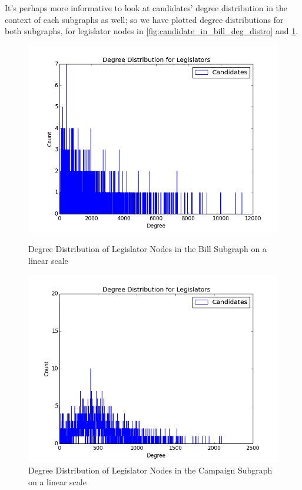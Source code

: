 \documentclass[12pt,twocolumn]{article}
\begin{document}
It's perhaps more informative to look at candidates' degree distribution in the context of each subgraphs as well; so we have plotted degree distributions for both subgraphs, for legislator nodes in \ref{fig:candidate_in_bill_deg_distro} and \ref{fig:candidate_in_campaign_deg_distro}. 

\begin{figure}
\centering
\begin{minipage}{0.45\linewidth}

\includegraphics[width=\linewidth]{candidate_in_bill_deg_distro}
\caption{Degree Distribution of Legislator Nodes in the Bill Subgraph on a linear scale}
\label{fig:candidate_in_bill_deg_distro}
\end{minipage}\hfill
\begin{minipage}{0.45\linewidth}

\includegraphics[width=\linewidth]{candidate_in_campaign_deg_distro}
\caption{Degree Distribution of Legislator Nodes in the Campaign Subgraph on a linear scale}
\label{fig:candidate_in_campaign_deg_distro}
 \end{minipage}
\end{figure}
\end{document}

